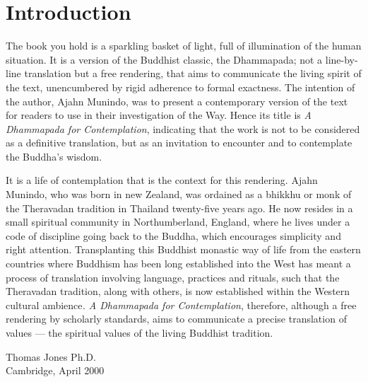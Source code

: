 
\chapter{Introduction}

The  book  you  hold  is  a  sparkling basket  of  light,  full  of  illumination  of  the human  situation.    It  is  a  version  of  the Buddhist  classic,  the  Dhammapada;  not  a line-by-line  translation  but  a  free  rendering, that aims to communicate the living spirit of the  text,  unencumbered  by  rigid  adherence to  formal  exactness. The  intention  of  the author,  Ajahn  Munindo,  was  to  present a  contemporary  version  of  the  text  for readers  to  use  in  their  investigation  of  the Way.    Hence  its  title  is  \emph{A  Dhammapada  for Contemplation}, indicating that the work is not to  be  considered  as  a  definitive  translation, but  as  an  invitation  to  encounter  and  to contemplate the Buddha’s wisdom. 

It  is  a  life  of  contemplation  that is  the  context  for  this  rendering. Ajahn Munindo,  who  was  born  in  new  Zealand, was  ordained  as  a  bhikkhu  or  monk  of  the Theravadan tradition in Thailand twenty-five years ago.  He now resides in a small spiritual community  in  Northumberland,  England, where  he  lives  under  a  code  of  discipline going back to the Buddha, which encourages simplicity and right attention.  Transplanting this  Buddhist  monastic  way  of  life  from the  eastern  countries  where  Buddhism  has been  long  established  into  the  West  has meant  a  process  of  translation  involving language, practices and rituals, such that the Theravadan  tradition,  along  with  others,  is now established within the Western cultural ambience\emph{.    A  Dhammapada  for  Contemplation}, therefore,  although  a  free  rendering  by scholarly  standards,  aims  to  communicate  a precise  translation  of  values   —  the  spiritual values of the living Buddhist tradition.

Thomas Jones Ph.D.\\
Cambridge, April 2000
